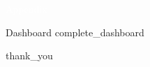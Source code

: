 {
\begin{frame}[plain]
    \LARGE
    \centering
    \textcolor{white}{Appendix}
\end{frame}
}

\begin{frame}{Dashboard}
    {complete_dashboard}
\end{frame}

{
{thank_you}
\begin{frame}[plain]
\end{frame}
}

